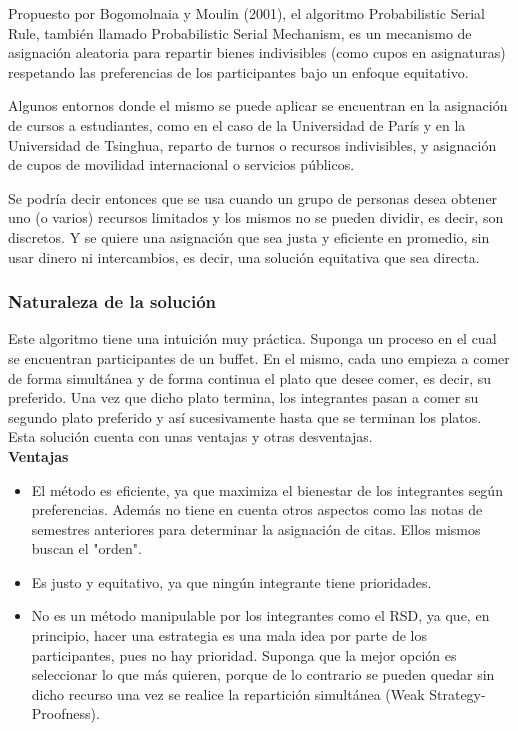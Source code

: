 \documentclass{article}
\begin{document}
Propuesto por Bogomolnaia y Moulin (2001), el algoritmo Probabilistic Serial Rule, también llamado 
Probabilistic Serial Mechanism, es un 
mecanismo de asignación aleatoria para repartir bienes indivisibles (como cupos en asignaturas) 
respetando las preferencias de los participantes bajo un enfoque equitativo.

Algunos entornos donde el mismo se puede aplicar se encuentran en la asignación de cursos a estudiantes,
como en el caso de la Universidad de París y en la Universidad de Tsinghua, reparto de turnos o 
recursos indivisibles, y asignación de cupos de movilidad internacional o servicios públicos.

Se podría decir entonces que se usa cuando un grupo de personas desea obtener uno (o varios) 
recursos limitados y los mismos no se pueden dividir, es decir, son discretos. Y se quiere una 
asignación que sea justa y eficiente en promedio, sin usar dinero ni intercambios, es decir, una 
solución equitativa que sea directa.

\subsubsection{Naturaleza de la solución}

Este algoritmo tiene una intuición muy práctica. Suponga un proceso en el cual se encuentran 
participantes de un buffet. En el mismo, cada uno empieza a comer de forma simultánea y de 
forma continua el plato que desee comer, es decir, su preferido. Una vez que dicho plato termina,
los integrantes pasan a comer su segundo plato preferido y así sucesivamente hasta que se terminan 
los platos.\\

Esta solución cuenta con unas ventajas y otras desventajas.\\

\textbf{Ventajas}

\begin{itemize}
  \item El método es eficiente, ya que maximiza el bienestar de los integrantes según preferencias.
  Además no tiene en cuenta otros aspectos como las notas de semestres anteriores para determinar la
  asignación de citas.
        Ellos mismos buscan el "orden".
  \item Es justo y equitativo, ya que ningún integrante tiene prioridades.
  \item No es un método manipulable por los integrantes como el RSD, ya que, en principio, hacer una 
        estrategia es una mala idea por parte de los participantes, pues no hay prioridad. Suponga que
        la mejor opción es seleccionar lo que más quieren, porque de lo contrario se pueden quedar sin 
        dicho recurso una vez se realice la repartición simultánea (Weak Strategy-Proofness).
\end{itemize}
\end{document}
